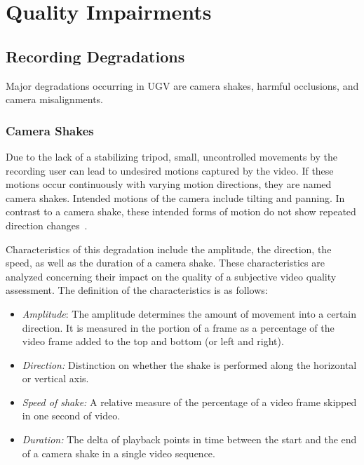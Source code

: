\section{Quality Impairments}
\label{sec:415_quality_impairments}
\subsection{Recording Degradations}
Major degradations occurring in \ac{UGV} are camera shakes, harmful occlusions, and camera misalignments.
\subsubsection{Camera Shakes}
Due to the lack of a stabilizing tripod, small, uncontrolled movements by the recording user can lead to undesired motions captured by the video.
If these motions occur continuously with varying motion directions, they are named camera shakes.
Intended motions of the camera include tilting and panning.
In contrast to a camera shake, these intended forms of motion do not show repeated direction changes~\cite{Ward2003}.

Characteristics of this degradation include the amplitude, the direction, the speed, as well as the duration of a camera shake.
These characteristics are analyzed concerning their impact on the quality of a subjective video quality assessment.
The definition of the characteristics is as follows:
\begin{itemize}
	\item \emph{Amplitude}: The amplitude determines the amount of movement into a certain direction. 
	It is measured in the portion of a frame as a percentage of the video frame added to the top and bottom (or left and right).
	\item \emph{Direction:} Distinction on whether the shake is performed along the horizontal or vertical axis.  
	\item \emph{Speed of shake:} A relative measure of the percentage of a video frame skipped in one second of video. 
	\item \emph{Duration:} The delta of playback points in time between the start and the end of a camera shake in a single video sequence.
\end{itemize}

